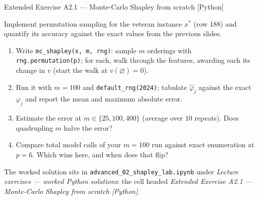\documentclass[aspectratio=169,11pt]{beamer}
\begin{document}
\begin{frame}{Extended Exercise A2.1 --- Monte-Carlo Shapley from scratch [Python]}
\begin{longexercise}
  \scriptsize
  Implement permutation sampling for the veteran instance $x^\ast$ (row 188) and
  quantify its accuracy against the exact values from the previous slides.
  \begin{enumerate}
    \item Write \texttt{mc\_shapley(x, m, rng)}: sample $m$ orderings with
          \texttt{rng.permutation(p)}; for each, walk through the features,
          awarding each its change in $v$ (start the walk at $v(\varnothing)=0$).
    \item Run it with $m=100$ and \texttt{default\_rng(2024)}; tabulate
          $\hat\varphi_j$ against the exact $\varphi_j$ and report the mean and
          maximum absolute error.
    \item Estimate the error at $m\in\{25, 100, 400\}$ (average over $10$
          repeats). Does quadrupling $m$ halve the error?
    \item Compare total model calls of your $m=100$ run against exact
          enumeration at $p=6$. Which wins here, and when does that flip?
  \end{enumerate}
\end{longexercise}
\begin{labnote}
  \scriptsize
  The worked solution sits in \texttt{advanced\_02\_shapley\_lab.ipynb} under
  \emph{Lecture exercises --- worked Python solutions}: the cell headed
  \emph{Extended Exercise A2.1 --- Monte-Carlo Shapley from scratch [Python]}.
\end{labnote}
\end{frame}
\end{document}
